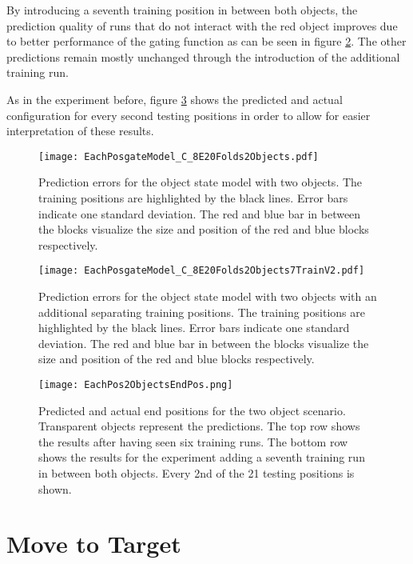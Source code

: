 By introducing a seventh training position in between both objects, the prediction quality of runs that do not interact with the red object improves due to better performance of the gating function as can be seen in figure \ref{fig:eachPosTwoObjects7Trains}. The other predictions remain mostly unchanged through the introduction of the additional training run.


As in the experiment before, figure \ref{fig:eachPosTwoObjectsEndPos} shows the predicted and actual configuration for every second testing positions in order to allow for easier interpretation of these results.

\begin{figure}[h]
\centering
\texttt{[image: EachPosgateModel\_C\_8E20Folds2Objects.pdf]}
\caption{Prediction errors for the object state model with two objects. The training positions are highlighted by the black lines. Error bars indicate one standard deviation. The red and blue bar in between the blocks visualize the size and position of the red and blue blocks respectively.}
\label{fig:eachPosTwoObjects}
\end{figure}

\begin{figure}[H]
\centering
\texttt{[image: EachPosgateModel\_C\_8E20Folds2Objects7TrainV2.pdf]}
\caption{Prediction errors for the object state model with two objects with an additional separating training positions. The training positions are highlighted by the black lines. Error bars indicate one standard deviation. The red and blue bar in between the blocks visualize the size and position of the red and blue blocks respectively.}
\label{fig:eachPosTwoObjects7Trains}
\end{figure}

\begin{figure}[h]
\centering
\texttt{[image: EachPos2ObjectsEndPos.png]}
\caption{Predicted and actual end positions for the two object scenario. Transparent objects represent the predictions. The top row shows the results after having seen six training runs. The bottom row shows the results for the experiment adding a seventh training run in between both objects. Every 2nd of the 21 testing positions is shown.}
\label{fig:eachPosTwoObjectsEndPos}
\end{figure}


\section{Move to Target \label{sec:moveToTarget}}

